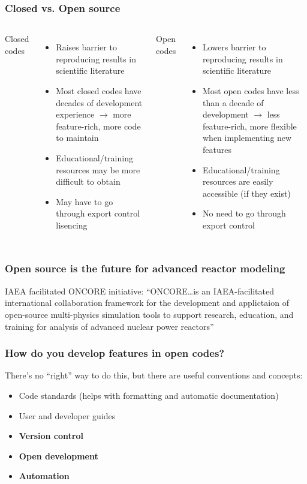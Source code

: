 \begin{frame}
    \frametitle{Closed vs. Open source}
    \begin{columns}
        \column[t]{5cm}
        Closed codes
        \begin{itemize}
            \item Raises barrier to reproducing results in scientific literature
            \item Most closed codes have decades of development experience $\rightarrow$ more feature-rich, more code to maintain
            \item Educational/training resources may be more difficult to obtain
            \item May have to go through export control lisencing
        \end{itemize}


        \column[t]{5cm}
        Open codes
        \begin{itemize}
            \item Lowers barrier to reproducing results in scientific literature
            \item Most open codes have less than a decade of development $\rightarrow$ less feature-rich, more flexible when implementing new features
            \item Educational/training resources are easily accessible (if they exist)
            \item No need to go through export control
        \end{itemize}
    \end{columns}

\end{frame}

\begin{frame}
    \frametitle{Open source is the future for advanced reactor modeling}
    \Gls{IAEA} facilitated \Gls{ONCORE} initiative\cite{fiorina_initiative_2021}:
    \newline
    \newline
    \noindent ``ONCORE\ldots is an IAEA-facilitated international collaboration framework for the development and applictaion of open-source multi-physics simulation tools to support research, education, and training for analysis of advanced nuclear power reactors''\cite{iaea_open-source}

\end{frame}

\begin{frame}[t]
    \frametitle{How do you develop features in open codes?}

    There's no ``right'' way to do this, but there are useful conventions and concepts:
    \begin{itemize}
        \item Code standards (helps with formatting and automatic documentation)
        \item User and developer guides
        \item {\bf Version control}
        \item {\bf Open development}
        \item {\bf Automation}
    \end{itemize}
\end{frame}
